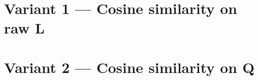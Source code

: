 \documentclass[11pt]{article}
\begin{document}
\section*{Variant 1 --- Cosine similarity on raw L}


\clearpage

\section*{Variant 2 --- Cosine similarity on Q}

\end{document}
